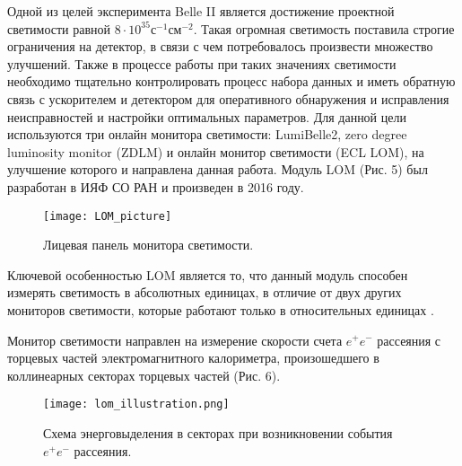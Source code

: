   Одной из целей эксперимента Belle II является достижение проектной светимости равной $8\cdot10^{35}$с$^{-1}$см$^{-2}$. Такая огромная светимость поставила строгие ограничения на детектор, в связи с чем потребовалось произвести множество улучшений. Также в процессе работы при таких значениях светимости необходимо тщательно контролировать процесс набора данных и иметь обратную связь с ускорителем и детектором для оперативного обнаружения и исправления неисправностей и  настройки оптимальных параметров. Для данной цели используются три онлайн монитора светимости: LumiBelle2, zero degree luminosity monitor (ZDLM) и онлайн монитор светимости (ECL LOM), на улучшение которого и направлена данная работа. Модуль LOM (Рис. 5) был разработан в ИЯФ СО РАН и произведен в 2016 году. 
\begin{figure}[htp]
  \centering
  \texttt{[image: LOM\_picture]}
  \caption{Лицевая панель монитора светимости.}
  \label{fig:galaxy}
\end{figure}
Ключевой особенностью LOM является то, что данный модуль способен измерять светимость в абсолютных единицах, в отличие от двух других мониторов светимости, которые работают только в относительных единицах \cite{LumiBelle2}.\par 
  Монитор светимости направлен на измерение скорости счета $e^+e^-$ рассеяния с торцевых частей электромагнитного калориметра, произошедшего в коллинеарных секторах торцевых частей (Рис. 6).
\begin{figure}[htp]
  \centering
  \texttt{[image: lom\_illustration.png]}
  \caption{Схема энерговыделения в секторах при возникновении события $e^+e^-$ рассеяния.}
  \label{fig:galaxy}
\end{figure}
